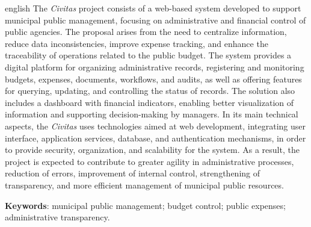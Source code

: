 \begin{resumo}[Abstract]
	\begin{otherlanguage*}{english}
		The \textit{Civitas} project consists of a web-based system developed to support municipal public management, focusing on administrative and financial control of public agencies. The proposal arises from the need to centralize information, reduce data inconsistencies, improve expense tracking, and enhance the traceability of operations related to the public budget. The system provides a digital platform for organizing administrative records, registering and monitoring budgets, expenses, documents, workflows, and audits, as well as offering features for querying, updating, and controlling the status of records. The solution also includes a dashboard with financial indicators, enabling better visualization of information and supporting decision-making by managers. In its main technical aspects, the \textit{Civitas} uses technologies aimed at web development, integrating user interface, application services, database, and authentication mechanisms, in order to provide security, organization, and scalability for the system. As a result, the project is expected to contribute to greater agility in administrative processes, reduction of errors, improvement of internal control, strengthening of transparency, and more efficient management of municipal public resources.
		
		\noindent\textbf{Keywords}: municipal public management; budget control; public expenses; administrative transparency.
	\end{otherlanguage*}
\end{resumo}